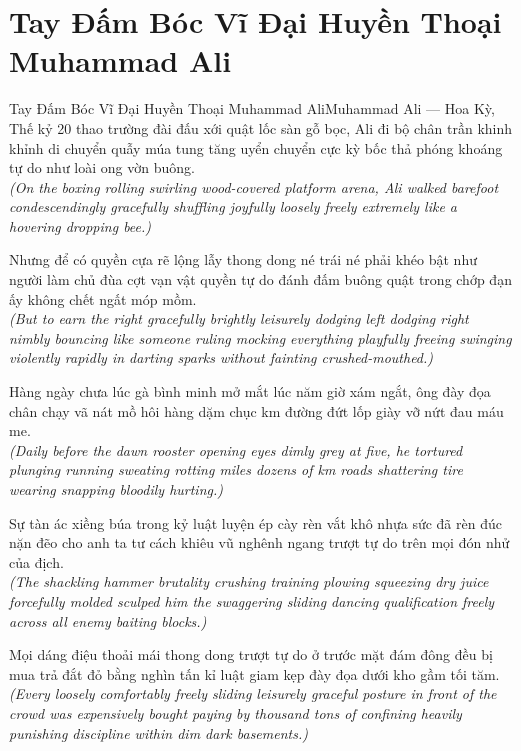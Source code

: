 \section{Tay Đấm Bóc Vĩ Đại Huyền Thoại Muhammad Ali}
\begin{truyen}{Tay Đấm Bóc Vĩ Đại Huyền Thoại Muhammad Ali}{Muhammad Ali --- Hoa Kỳ, Thế kỷ 20}
 thao trường đài đấu xới quật lốc sàn gỗ bọc, Ali đi bộ chân trần khinh khỉnh di chuyển quẫy múa tung tăng uyển chuyển cực kỳ bốc thả phóng khoáng tự do như loài ong vờn buông.\\[4pt]
\textit{(On the boxing rolling swirling wood-covered platform arena, Ali walked barefoot condescendingly gracefully shuffling joyfully loosely freely extremely like a hovering dropping bee.)}

Nhưng để có quyền cựa rẽ lộng lẫy thong dong né trái né phải khéo bật như người làm chủ đùa cợt vạn vật quyền tự do đánh đấm buông quật trong chớp đạn ấy không chết ngất móp mồm.\\[4pt]
\textit{(But to earn the right gracefully brightly leisurely dodging left dodging right nimbly bouncing like someone ruling mocking everything playfully freeing swinging violently rapidly in darting sparks without fainting crushed-mouthed.)}

Hàng ngày chưa lúc gà bình minh mở mắt lúc năm giờ xám ngắt, ông đày đọa chân chạy vã nát mồ hôi hàng dặm chục km đường đứt lốp giày vỡ nứt đau máu me.\\[4pt]
\textit{(Daily before the dawn rooster opening eyes dimly grey at five, he tortured plunging running sweating rotting miles dozens of km roads shattering tire wearing snapping bloodily hurting.)}

Sự tàn ác xiềng búa trong kỷ luật luyện ép cày rèn vắt khô nhựa sức đã rèn đúc nặn đẽo cho anh ta tư cách khiêu vũ nghênh ngang trượt tự do trên mọi đón nhử của địch.\\[4pt]
\textit{(The shackling hammer brutality crushing training plowing squeezing dry juice forcefully molded sculped him the swaggering sliding dancing qualification freely across all enemy baiting blocks.)}

\end{truyen}
\begin{baihoc}
  Mọi dáng điệu thoải mái thong dong trượt tự do ở trước mặt đám đông đều bị mua trả đắt đỏ bằng nghìn tấn kỉ luật giam kẹp đày đọa dưới kho gầm tối tăm.\\[4pt]
  \textit{(Every loosely comfortably freely sliding leisurely graceful posture in front of the crowd was expensively bought paying by thousand tons of confining heavily punishing discipline within dim dark basements.)}
\end{baihoc}

